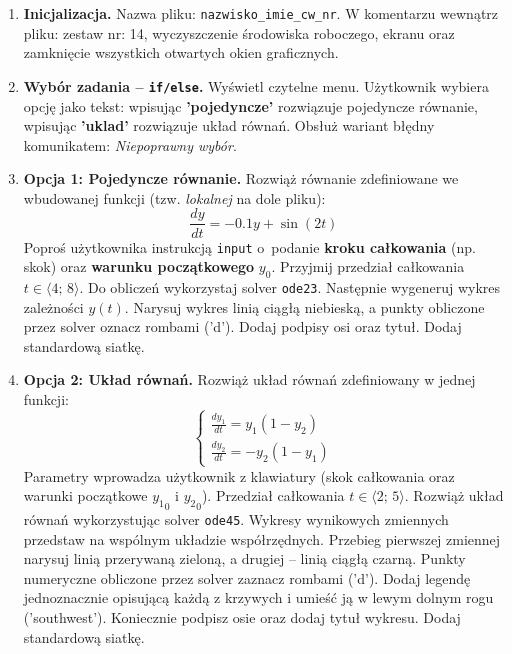 \documentclass[a4paper,11pt]{article}
\begin{document}
\begin{enumerate}[leftmargin=*, label=\textbf{\arabic*.}, itemsep=2pt]

  \item \textbf{Inicjalizacja.}
    Nazwa pliku: \texttt{nazwisko\_imie\_cw\_nr}. W komentarzu wewnątrz pliku: zestaw nr: 14, wyczyszczenie środowiska roboczego, ekranu oraz zamknięcie wszystkich otwartych okien graficznych.

  \item \textbf{Wybór zadania -- \texttt{if/else}.}
    Wyświetl czytelne menu. Użytkownik wybiera opcję jako tekst: wpisując \textbf{'pojedyncze'} rozwiązuje pojedyncze równanie, wpisując \textbf{'uklad'} rozwiązuje układ równań. Obsłuż wariant błędny komunikatem: \textit{Niepoprawny wybór}.

  \item \textbf{Opcja 1: Pojedyncze równanie.}
    Rozwiąż równanie zdefiniowane we wbudowanej funkcji (tzw. \textit{lokalnej} na dole pliku):
    \[ \frac{dy}{dt} = -0.1y + \sin(2t) \]
    Poproś użytkownika instrukcją \texttt{input} o~podanie \textbf{kroku całkowania} (np. skok) oraz \textbf{warunku początkowego} $y_0$. Przyjmij przedział całkowania $t \in \langle 4;\,8 \rangle$.
    Do obliczeń wykorzystaj solver \texttt{ode23}. Następnie wygeneruj wykres zależności $y(t)$. Narysuj wykres linią ciągłą niebieską, a punkty obliczone przez solver oznacz rombami ('d'). Dodaj podpisy osi oraz tytuł. Dodaj standardową siatkę.

  \item \textbf{Opcja 2: Układ równań.}
    Rozwiąż układ równań zdefiniowany w jednej funkcji:\\[-0.5em]
    \[
    \begin{cases}
      \frac{dy_1}{dt} = y_1(1 - y_2) \\
      \frac{dy_2}{dt} = -y_2(1 - y_1)
    \end{cases}
    \]
    Parametry wprowadza użytkownik z klawiatury (skok całkowania oraz warunki początkowe $ {y_1}_{0} $ i $ {y_2}_{0} $). Przedział całkowania $t \in \langle 2;\,5 \rangle$.
    Rozwiąż układ równań wykorzystując solver \texttt{ode45}. Wykresy wynikowych zmiennych przedstaw na wspólnym układzie współrzędnych. Przebieg pierwszej zmiennej narysuj linią przerywaną zieloną, a drugiej -- linią ciągłą czarną. Punkty numeryczne obliczone przez solver zaznacz rombami ('d'). Dodaj legendę jednoznacznie opisującą każdą z krzywych i umieść ją w lewym dolnym rogu ('southwest'). Koniecznie podpisz osie oraz dodaj tytuł wykresu. Dodaj standardową siatkę.

\end{enumerate}
\end{document}
